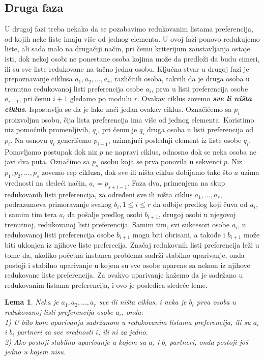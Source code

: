 \documentclass[a4paper]{article}
\newtheorem{lemma}{Lema}
\begin{document}
\subsection{Druga faza}
U drugoj fazi treba nekako da se pozabavimo redukovanim listama preferencija, od kojih neke liste imaju više od jednog elementa. U ovoj fazi ponovo redukujemo liste, ali sada malo na drugačiji način, pri čemu kriterijum zaustavljanja ostaje isti, dok nekoj osobi ne ponestane osoba kojima može da predloži da budu cimeri, ili su sve liste redukovane na tačno jednu osobu.
\newline
Ključna stvar u drugoj fazi je prepoznavanje ciklusa $a_1, a_2, ..., a_r$, različitih osoba, takvih da je druga osoba u trenutno redukovanoj listi preferencija osobe $a_i$, prva u listi preferencija osobe $a_{i+1}$, pri čemu $i+1$ gledamo po modulu $r$. Ovakav ciklus zovemo \textit{\textbf{sve li ništa ciklus}}.
\newline
Ispostavlja se da je lako naći jedan ovakav ciklus. Označićemo sa $p_1$ proizvoljnu osobu, čija lista preferencija ima više od jednog elementa. Koristimo niz pomoćnih promenljivih, $q_i$, pri čemu je $q_i$ druga osoba u listi preferencija od $p_i$. Na osnovu $q_i$ generišemo $p_{i+1}$, uzimajući poslednji element iz liste osobe $q_i$. Ponavljamo postupak dok niz $p$ ne napravi ciklus, odnosno dok se neka osoba ne javi dva puta. Označimo sa $p_s$ osobu koja se prva ponovila u sekvenci $p$. Niz $p_1, p_2, ..., p_s$ zovemo rep ciklusa, dok sve ili ništa ciklus dobijamo tako što $a$ uzima vrednosti na sledeći način, $a_i = p_{s+i-1}$.
\newline
Faza dva, primenjena na skup redukovanih listi preferencija, za određeni sve ili ništa ciklus $a_1, ..., a_r$, podrazumeva primoravanje svakog $b_i, 1\leq i \leq r$ da odbije predlog koji čuva od $a_i$, i samim tim tera $a_i$ da pošalje predlog osobi $b_{i+1}$, drugoj osobi u njegovoj trenutnoj, redukovanoj listi preferencija. Samim tim, svi sukcesori osobe $a_i$, u redukovanoj listi preferencija osobe $b_{i+1}$ mogu biti obrisani, a takođe i $b_{i+1}$ može biti uklonjen iz njihove liste preferecija.
\newline
Značaj redukovnih listi preferencija leži u tome da, ukoliko početna instanca problema sadrži stabilno uparivanje, onda postoji i stabilno uparivanje u kojem su sve osobe uparene sa nekom iz njihove redukovane liste preferencija. Za ovakvo uparivanje kažemo da je sadržano u redukovanim listama preferencija, i ovo je posledica sledeće leme.

\begin{lemma}
        Neka je $a_1, a_2, ..., a_r$ sve ili ništa ciklus, i neka je $b_i$ prva osoba u redukovanoj listi preferencija osobe $a_i$, onda:\\

        1) U bilo kom uparivanju sadržanom u redukovanim listama preferencija, ili su $a_i$ i $b_i$ partneri za sve vrednosti $i$, ili ni za jedno.\\
        
        2) Ako postoji stabilno uparivanje u kojem su $a_i$ i $b_i$ partneri, onda postoji još jedno u kojem nisu.
        
\end{lemma}
\end{document}
